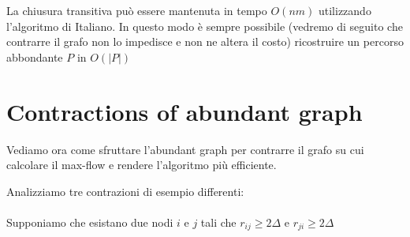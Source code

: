 \documentclass[a4paper, 11pt]{report}
\begin{document}
La chiusura transitiva può essere mantenuta in tempo $O(nm)$ utilizzando l'algoritmo di Italiano. 
In questo modo è sempre possibile (vedremo di seguito che contrarre il grafo non lo impedisce e non ne altera il costo) ricostruire un percorso abbondante $P$ in $O(|P|)$
\newpage
\section{Contractions of abundant graph}
Vediamo ora come sfruttare l'abundant graph per contrarre il grafo su cui calcolare il max-flow e rendere l'algoritmo più efficiente.

Analizziamo tre contrazioni di esempio differenti:\\
\\
Supponiamo che esistano due nodi $i$ e $j$ tali che $r_{ij} \ge 2\Delta$ e $r_{ji} \ge 2\Delta$
\end{document}
